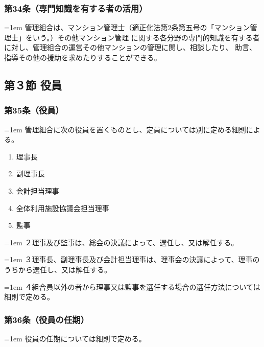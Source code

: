 \documentclass[
  luatex,
  paper=a4paper,
  fontsize=11pt,
  jafontsize=11pt,
  jlreq_notes,
]{jlreq}
\newcommand{\joumain}[1]{%
  \noindent\hangindent=1em\hangafter=1
  \hspace{1em}#1%
}
\newcommand{\kou}[2]{%
  \par\noindent\hangindent=1em\hangafter=1
  #1\hspace{1em}#2%
}
\begin{document}
  \subsubsection*{第34条（専門知識を有する者の活用）}
  \joumain{管理組合は、マンション管理士（適正化法第2条第五号の「マンション管理士」をいう。）その他マンション管理
  に関する各分野の専門的知識を有する者に対し、管理組合の運営その他マンションの管理に関し、相談したり、
  助言、指導その他の援助を求めたりすることができる。}
  
  \begin{center}
  \subsection*{第３節 役員}
  \end{center}

  \subsubsection*{第35条（役員）}
  \joumain{管理組合に次の役員を置くものとし、定員については別に定める細則による。}
  \begin{enumerate}
    \item 理事長
    \item 副理事長
    \item 会計担当理事
    \item 全体利用施設協議会担当理事
    \item 監事
  \end{enumerate}
  \kou{２}{理事及び監事は、総会の決議によって、選任し、又は解任する。}
  \kou{３}{理事長、副理事長及び会計担当理事は、理事会の決議によって、理事のうちから選任し、又は解任する。}
  \kou{４}{組合員以外の者から理事又は監事を選任する場合の選任方法については細則で定める。}

  \subsubsection*{第36条（役員の任期）}
  \joumain{役員の任期については細則で定める。}
  
\end{document}
